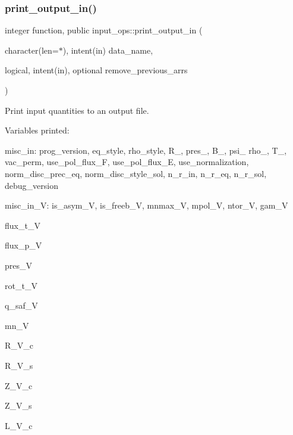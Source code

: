 \subsubsection{\texorpdfstring{print\+\_\+output\+\_\+in()}{print\_output\_in()}}
{\footnotesize\ttfamily integer function, public input\+\_\+ops\+::print\+\_\+output\+\_\+in (\begin{DoxyParamCaption}\item[{character(len=$\ast$), intent(in)}]{data\+\_\+name,  }\item[{logical, intent(in), optional}]{remove\+\_\+previous\+\_\+arrs }\end{DoxyParamCaption})}



Print input quantities to an output file. 

Variables printed\+:
\begin{DoxyItemize}
\item {\ttfamily misc\+\_\+in\+:} {\ttfamily prog\+\_\+version}, {\ttfamily eq\+\_\+style}, {\ttfamily rho\+\_\+style}, {\ttfamily R\+\_}, {\ttfamily pres\+\_}, {\ttfamily B\+\_}, {\ttfamily psi\+\_} {\ttfamily rho\+\_}, {\ttfamily T\+\_}, {\ttfamily vac\+\_\+perm}, {\ttfamily use\+\_\+pol\+\_\+flux\+\_\+F}, {\ttfamily use\+\_\+pol\+\_\+flux\+\_\+E}, {\ttfamily use\+\_\+normalization}, {\ttfamily norm\+\_\+disc\+\_\+prec\+\_\+eq}, {\ttfamily norm\+\_\+disc\+\_\+style\+\_\+sol}, {\ttfamily n\+\_\+r\+\_\+in}, {\ttfamily n\+\_\+r\+\_\+eq}, {\ttfamily n\+\_\+r\+\_\+sol}, {\ttfamily debug\+\_\+version} 
\item {\ttfamily misc\+\_\+in\+\_\+V\+:} {\ttfamily is\+\_\+asym\+\_\+V}, {\ttfamily is\+\_\+freeb\+\_\+V}, {\ttfamily mnmax\+\_\+V}, {\ttfamily mpol\+\_\+V}, {\ttfamily ntor\+\_\+V}, {\ttfamily gam\+\_\+V} 
\item {\ttfamily flux\+\_\+t\+\_\+V} 
\item {\ttfamily flux\+\_\+p\+\_\+V} 
\item {\ttfamily pres\+\_\+V} 
\item {\ttfamily rot\+\_\+t\+\_\+V} 
\item {\ttfamily q\+\_\+saf\+\_\+V} 
\item {\ttfamily mn\+\_\+V} 
\item {\ttfamily R\+\_\+\+V\+\_\+c} 
\item {\ttfamily R\+\_\+\+V\+\_\+s} 
\item {\ttfamily Z\+\_\+\+V\+\_\+c} 
\item {\ttfamily Z\+\_\+\+V\+\_\+s} 
\item {\ttfamily L\+\_\+\+V\+\_\+c} 

\end{DoxyItemize}
